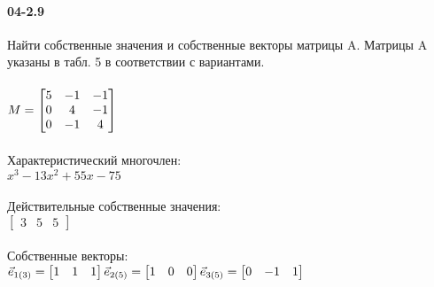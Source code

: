 \documentclass[12pt]{article}
\begin{document}

	\clearpage
	\paragraph{04-2.9} Найти собственные значения и собственные векторы матрицы A. Матрицы A указаны в табл. 5 в соответствии с вариантами. \\\\
	\ensuremath {
		M = \begin{bmatrix}
			5 & -1 & -1 \\
			0 &  4 & -1 \\
			0 & -1 &  4
		\end{bmatrix} \\
	} \\ \\
	Характеристический многочлен: \\
	\ensuremath{
		x ^3 - 13 x ^2 + 55 x - 75
	} \\ \\
	Действительные собственные значения: \\
	\ensuremath{
		\begin{bmatrix}
			3 & 5 & 5
		\end{bmatrix}
	} \\ \\
	Собственные векторы: \\
	\ensuremath{
		\vec{e}_{1(3)} = \begin{bmatrix} 1 & 1 & 1 \end{bmatrix} \\
		\vec{e}_{2(5)} = \begin{bmatrix} 1 & 0 & 0 \end{bmatrix} \\
		\vec{e}_{3(5)} = \begin{bmatrix} 0 & -1 & 1 \end{bmatrix} \\
	}
\end{document}

